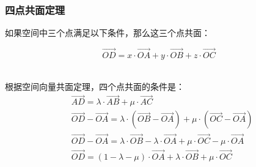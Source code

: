 \documentclass[UTF8]{ctexart}
\begin{document}
\subsubsection{四点共面定理}
    如果空间中三个点满足以下条件，那么这三个点共面：
    \begin{large}
        \begin{equation*}
            \overrightarrow{OD}=x\cdot\overrightarrow{OA}+y\cdot\overrightarrow{OB}+z\cdot\overrightarrow{OC}
        \end{equation*}
    \end{large}\\
    根据空间向量共面定理，四个点共面的条件是：\vspace{3pt}
    \setcounter{equation}{0}
    \begin{align}
        &\overrightarrow{AD}=\lambda\cdot\overrightarrow{AB}+\mu\cdot\overrightarrow{AC}\\[3mm]
        &\overrightarrow{OD}-\overrightarrow{OA}=\lambda\cdot\left(\overrightarrow{OB}-\overrightarrow{OA}\right)+\mu\cdot\left(\overrightarrow{OC}-\overrightarrow{OA}\right)\\[3mm]
        &\overrightarrow{OD}-\overrightarrow{OA}=\lambda\cdot\overrightarrow{OB}-\lambda\cdot\overrightarrow{OA}+\mu\cdot\overrightarrow{OC}-\mu\cdot\overrightarrow{OA}\\[3mm]
        &\overrightarrow{OD}=(1-\lambda-\mu)\cdot\overrightarrow{OA}+\lambda\cdot\overrightarrow{OB}+\mu\cdot\overrightarrow{OC}
    \end{align}

\newpage
\end{document}
